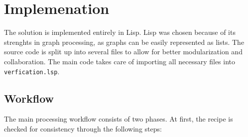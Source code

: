 \chapter{Implemenation}
\label{sec:impl}

    The solution is implemented entirely in Lisp. Lisp was chosen because of its
    strenghts in graph processing, as graphs can be easily represented as lists.
    The source code is split up into several files to allow for better
    modularization and collaboration. The main code takes care of importing all
    necessary files into \texttt{verfication.lsp}.
    
    \section{Workflow}
    
        The main processing workflow consists of two phases. At first, the
        recipe is checked for consistency through the following steps:
        
